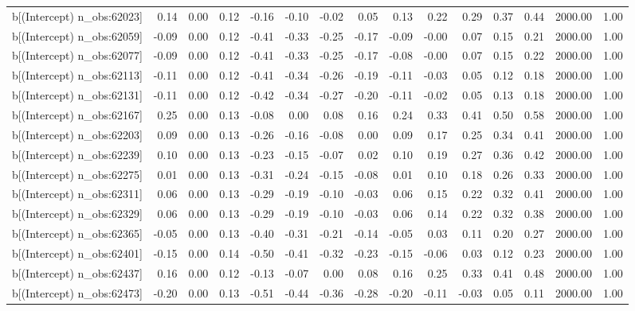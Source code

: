 \begin{table}[ht]
\begin{tabular}{rrrrrrrrrrrrrrr}
  b[(Intercept) n\_obs:62023] & 0.14 & 0.00 & 0.12 & -0.16 & -0.10 & -0.02 & 0.05 & 0.13 & 0.22 & 0.29 & 0.37 & 0.44 & 2000.00 & 1.00 \\ 
  b[(Intercept) n\_obs:62059] & -0.09 & 0.00 & 0.12 & -0.41 & -0.33 & -0.25 & -0.17 & -0.09 & -0.00 & 0.07 & 0.15 & 0.21 & 2000.00 & 1.00 \\ 
  b[(Intercept) n\_obs:62077] & -0.09 & 0.00 & 0.12 & -0.41 & -0.33 & -0.25 & -0.17 & -0.08 & -0.00 & 0.07 & 0.15 & 0.22 & 2000.00 & 1.00 \\ 
  b[(Intercept) n\_obs:62113] & -0.11 & 0.00 & 0.12 & -0.41 & -0.34 & -0.26 & -0.19 & -0.11 & -0.03 & 0.05 & 0.12 & 0.18 & 2000.00 & 1.00 \\ 
  b[(Intercept) n\_obs:62131] & -0.11 & 0.00 & 0.12 & -0.42 & -0.34 & -0.27 & -0.20 & -0.11 & -0.02 & 0.05 & 0.13 & 0.18 & 2000.00 & 1.00 \\ 
  b[(Intercept) n\_obs:62167] & 0.25 & 0.00 & 0.13 & -0.08 & 0.00 & 0.08 & 0.16 & 0.24 & 0.33 & 0.41 & 0.50 & 0.58 & 2000.00 & 1.00 \\ 
  b[(Intercept) n\_obs:62203] & 0.09 & 0.00 & 0.13 & -0.26 & -0.16 & -0.08 & 0.00 & 0.09 & 0.17 & 0.25 & 0.34 & 0.41 & 2000.00 & 1.00 \\ 
  b[(Intercept) n\_obs:62239] & 0.10 & 0.00 & 0.13 & -0.23 & -0.15 & -0.07 & 0.02 & 0.10 & 0.19 & 0.27 & 0.36 & 0.42 & 2000.00 & 1.00 \\ 
  b[(Intercept) n\_obs:62275] & 0.01 & 0.00 & 0.13 & -0.31 & -0.24 & -0.15 & -0.08 & 0.01 & 0.10 & 0.18 & 0.26 & 0.33 & 2000.00 & 1.00 \\ 
  b[(Intercept) n\_obs:62311] & 0.06 & 0.00 & 0.13 & -0.29 & -0.19 & -0.10 & -0.03 & 0.06 & 0.15 & 0.22 & 0.32 & 0.41 & 2000.00 & 1.00 \\ 
  b[(Intercept) n\_obs:62329] & 0.06 & 0.00 & 0.13 & -0.29 & -0.19 & -0.10 & -0.03 & 0.06 & 0.14 & 0.22 & 0.32 & 0.38 & 2000.00 & 1.00 \\ 
  b[(Intercept) n\_obs:62365] & -0.05 & 0.00 & 0.13 & -0.40 & -0.31 & -0.21 & -0.14 & -0.05 & 0.03 & 0.11 & 0.20 & 0.27 & 2000.00 & 1.00 \\ 
  b[(Intercept) n\_obs:62401] & -0.15 & 0.00 & 0.14 & -0.50 & -0.41 & -0.32 & -0.23 & -0.15 & -0.06 & 0.03 & 0.12 & 0.23 & 2000.00 & 1.00 \\ 
  b[(Intercept) n\_obs:62437] & 0.16 & 0.00 & 0.12 & -0.13 & -0.07 & 0.00 & 0.08 & 0.16 & 0.25 & 0.33 & 0.41 & 0.48 & 2000.00 & 1.00 \\ 
  b[(Intercept) n\_obs:62473] & -0.20 & 0.00 & 0.13 & -0.51 & -0.44 & -0.36 & -0.28 & -0.20 & -0.11 & -0.03 & 0.05 & 0.11 & 2000.00 & 1.00 \\ 

\end{tabular}
\end{table}
